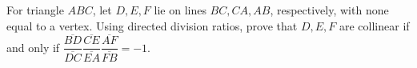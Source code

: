 For triangle $ABC$, let $D,E,F$ lie on lines $BC,CA,AB$, respectively, with none equal to a vertex. Using directed division ratios, prove that $D,E,F$ are collinear if and only if $\dfrac{\overline{BD}}{\overline{DC}}\dfrac{\overline{CE}}{\overline{EA}}\dfrac{\overline{AF}}{\overline{FB}}=-1$.
